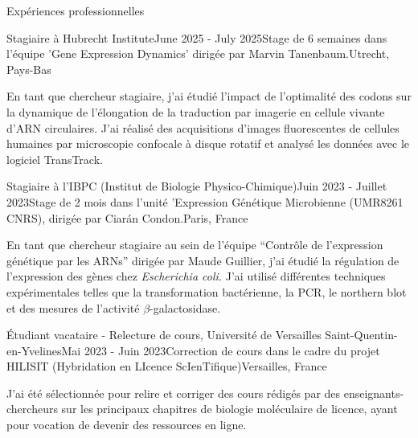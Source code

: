 \documentclass[
	10pt,
]{style} %
\begin{document}

	\begin{rSection}{Expériences professionnelles}

	\begin{rSubsection}{Stagiaire à Hubrecht Institute}{June 2025 - July 2025}{Stage de 6 semaines dans l'équipe 'Gene Expression Dynamics' dirigée par Marvin Tanenbaum.}{Utrecht, Pays-Bas}
		\item En tant que chercheur stagiaire, j'ai étudié l'impact de l'optimalité des codons sur la dynamique de l’élongation de la traduction par imagerie en cellule vivante d’ARN circulaires. J’ai réalisé des acquisitions d’images fluorescentes de cellules humaines par microscopie confocale à disque rotatif et analysé les données avec le logiciel TransTrack.
	\end{rSubsection}

	\begin{rSubsection}{Stagiaire à l'IBPC (Institut de Biologie Physico-Chimique)}{Juin 2023 - Juillet 2023}{Stage de 2 mois dans l'unité 'Expression Génétique Microbienne (UMR8261 CNRS), dirigée par Ciarán Condon.}{Paris, France}
		\item En tant que chercheur stagiaire au sein de l'équipe ``Contrôle de l'expression génétique par les ARNs'' dirigée par Maude Guillier, j'ai étudié la régulation de l'expression des gènes chez \textit{Escherichia coli.} J'ai utilisé différentes techniques expérimentales telles que la transformation bactérienne, la PCR, le northern blot et des mesures de l’activité $\beta$-galactosidase.

	\end{rSubsection}


	\begin{rSubsection}{Étudiant vacataire - Relecture de cours, Université de Versailles Saint-Quentin-en-Yvelines}{Mai 2023 - Juin 2023}{Correction de cours dans le cadre du projet HILISIT (Hybridation en LIcence ScIenTifique)}{Versailles, France}
		\item J'ai été sélectionnée pour relire et corriger des cours rédigés par des enseignants-chercheurs sur les principaux chapitres de biologie moléculaire de licence, ayant pour vocation de devenir des ressources en ligne.
	\end{rSubsection}

	\end{rSection}
\end{document}
